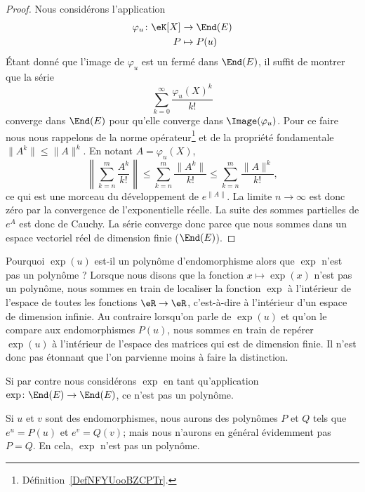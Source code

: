 \begin{proof}
    Nous considérons l'application
    \begin{equation}
        \begin{aligned}
            \varphi_u\colon \eK[X]&\to \End(E) \\
            P&\mapsto P(u)
        \end{aligned}
    \end{equation}
    Étant donné que l'image de \( \varphi_u\) est un fermé dans \( \End(E)\), il suffit de montrer que la série
    \begin{equation}
        \sum_{k=0}^{\infty}\frac{ \varphi_u(X)^k }{ k! }
    \end{equation}
    converge dans \( \End(E)\) pour qu'elle converge dans \( \Image(\varphi_u)\). Pour ce faire nous nous rappelons de la norme opérateur\footnote{Définition~\ref{DefNFYUooBZCPTr}.} et de la propriété fondamentale \( \| A^k \|\leq \| A \|^k\). En notant \( A=\varphi_u(X)\),
    \begin{equation}
        \left\| \sum_{k=n}^m\frac{ A^k }{ k! } \right\|\leq \sum_{k=n}^m\frac{ \| A^k \| }{ k! }\leq \sum_{k=n}^m\frac{ \| A \|^k }{ k! },
    \end{equation}
    ce qui est une morceau du développement de \(  e^{\| A \|}\). La limite \( n\to\infty\) est donc zéro par la convergence de l'exponentielle réelle. La suite des sommes partielles de  $e^{A}$ est donc de Cauchy. La série converge donc parce que nous sommes dans un espace vectoriel réel de dimension finie (\( \End(E)\)).
\end{proof}

\begin{normaltext}
    Pourquoi \( \exp(u)\) est-il un polynôme d'endomorphisme alors que \( \exp\) n'est pas un polynôme ? Lorsque nous disons que la fonction \( x\mapsto \exp(x)\) n'est pas un polynôme, nous sommes en train de localiser la fonction \( \exp\) à l'intérieur de l'espace de toutes les fonctions \( \eR\to \eR\), c'est-à-dire à l'intérieur d'un espace de dimension infinie. Au contraire lorsqu'on parle de \( \exp(u)\) et qu'on le compare aux endomorphismes \( P(u)\), nous sommes en train de repérer \( \exp(u)\) à l'intérieur de l'espace des matrices qui est de dimension finie. Il n'est donc pas étonnant que l'on parvienne moins à faire la distinction.

    Si par contre nous considérons \( \exp\) en tant qu'application \( \exp\colon \End(E)\to \End(E)\), ce n'est pas un polynôme.

    Si \( u\) et \( v\) sont des endomorphismes, nous aurons des polynômes \( P\) et \( Q\) tels que \( e^u=P(u)\) et \( e^v=Q(v)\); mais nous n'aurons en général évidemment pas \( P=Q\). En cela, \( \exp\) n'est pas un polynôme.
\end{normaltext}

